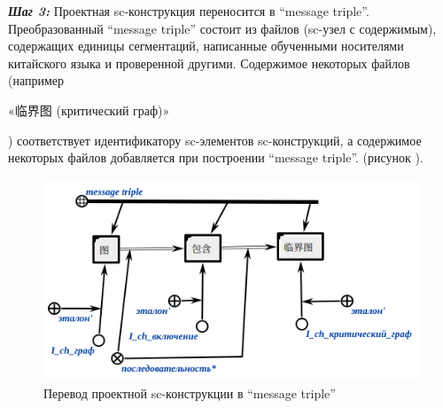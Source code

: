 \textbf{\textit{Шаг 3:}} Проектная sc-конструкция переносится в ``message triple''. Преобразованный ``message triple'' состоит из файлов (sc-узел с содержимым), содержащих единицы сегментаций, написанные обученными носителями китайского языка и проверенной другими. Содержимое некоторых файлов (например \begin{CJK}{UTF8}{gbsn} «临界图 (критический граф)» \end{CJK}) соответствует идентификатору sc-элементов sc-конструкций, а содержимое некоторых файлов добавляется при построении ``message triple''. (рисунок \textit{}).
\begin{figure}[H]
	\centering
	\includegraphics[scale=0.7]{images/part4/chapter_chinese/message_triple.png}
	\caption{Перевод проектной sc-конструкции в ``message triple''}
	\label{fig:message-triple}
\end{figure}

